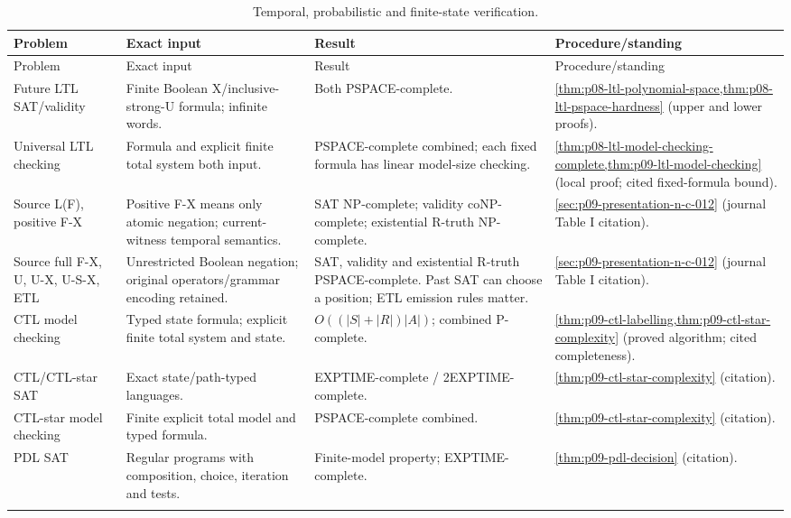 \begin{landscape}
\begingroup\small\setlength{\tabcolsep}{3pt}
\begin{longtable}{@{}p{.18\linewidth}p{.25\linewidth}p{.23\linewidth}p{.26\linewidth}@{}}
\caption{Temporal, probabilistic and finite-state verification.}\label{tab:p14-dc-temporal}\\
\toprule
Problem & Exact input & Result & Procedure/standing\\\midrule
\endfirsthead
\toprule
Problem & Exact input & Result & Procedure/standing\\\midrule
\endhead
\bottomrule\endfoot
Future LTL SAT/validity & Finite Boolean X/inclusive-strong-U formula; infinite words. & Both PSPACE-complete. & \cref{thm:p08-ltl-polynomial-space,thm:p08-ltl-pspace-hardness} (upper and lower proofs).\\\addlinespace
Universal LTL checking & Formula and explicit finite total system both input. & PSPACE-complete combined; each fixed formula has linear model-size checking. & \cref{thm:p08-ltl-model-checking-complete,thm:p09-ltl-model-checking} (local proof; cited fixed-formula bound).\\\addlinespace
Source L(F), positive F-X & Positive F-X means only atomic negation; current-witness temporal semantics. & SAT NP-complete; validity coNP-complete; existential R-truth NP-complete. & \cref{sec:p09-presentation-n-c-012} (journal Table I citation).\\\addlinespace
Source full F-X, U, U-X, U-S-X, ETL & Unrestricted Boolean negation; original operators/grammar encoding retained. & SAT, validity and existential R-truth PSPACE-complete. Past SAT can choose a position; ETL emission rules matter. & \cref{sec:p09-presentation-n-c-012} (journal Table I citation).\\\addlinespace
CTL model checking & Typed state formula; explicit finite total system and state. & \(O((|S|+|R|)|A|)\); combined P-complete. & \cref{thm:p09-ctl-labelling,thm:p09-ctl-star-complexity} (proved algorithm; cited completeness).\\\addlinespace
CTL/CTL-star SAT & Exact state/path-typed languages. & EXPTIME-complete / 2EXPTIME-complete. & \cref{thm:p09-ctl-star-complexity} (citation).\\\addlinespace
CTL-star model checking & Finite explicit total model and typed formula. & PSPACE-complete combined. & \cref{thm:p09-ctl-star-complexity} (citation).\\\addlinespace
PDL SAT & Regular programs with composition, choice, iteration and tests. & Finite-model property; EXPTIME-complete. & \cref{thm:p09-pdl-decision} (citation).\\\addlinespace

\end{longtable}
\end{landscape}
